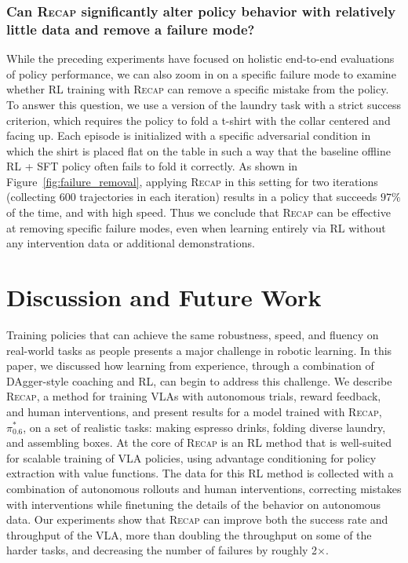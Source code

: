 \documentclass[conference]{IEEEtran}
\def \ModelSymbol {$\pi^{*}_{0.6}$}
\def \MethodName {\textsc{Recap}}
\begin{document}
\subsubsection{Can \MethodName{} significantly alter policy behavior with relatively little data and remove a failure mode?}
While the preceding experiments have focused on holistic end-to-end evaluations of policy performance, we can also zoom in on a specific failure mode to examine whether RL training with \MethodName{} can remove a specific mistake from the policy. To answer this question, we use a version of the laundry task with a strict success criterion, which requires the policy to fold a t-shirt with the collar centered and facing up. Each episode is initialized with a specific adversarial condition in which the shirt is placed flat on the table in such a way that the baseline offline RL + SFT policy often fails to fold it correctly. As shown in Figure~\ref{fig:failure_removal}, applying \MethodName{} in this setting for two iterations (collecting $600$ trajectories in each iteration) results in a policy that succeeds $97 \%$ of the time, and with high speed. Thus we conclude that \MethodName{} can be effective at removing specific failure modes, even when learning entirely via RL without any intervention data or additional demonstrations.










\section{Discussion and Future Work}

Training policies that can achieve the same robustness, speed, and fluency on real-world tasks as people presents a major challenge in robotic learning. In this paper, we discussed how learning from experience, through a combination of DAgger-style coaching and RL, can begin to address this challenge. We describe \MethodName{}, a method for training VLAs with autonomous trials, reward feedback, and human interventions, and present results for a model trained with \MethodName{}, \ModelSymbol{}, on a set of realistic tasks: making espresso drinks, folding diverse laundry, and assembling boxes. At the core of \MethodName{} is an RL method that is well-suited for scalable training of VLA policies, using advantage conditioning for policy extraction with value functions. The data for this RL method is collected with a combination of autonomous rollouts and human interventions, correcting mistakes with interventions while finetuning the details of the behavior on autonomous data. Our experiments show that \MethodName{} can improve both the success rate and throughput of the VLA, more than doubling the throughput on some of the harder tasks, and decreasing the number of failures by roughly 2$\times$.
\end{document}
